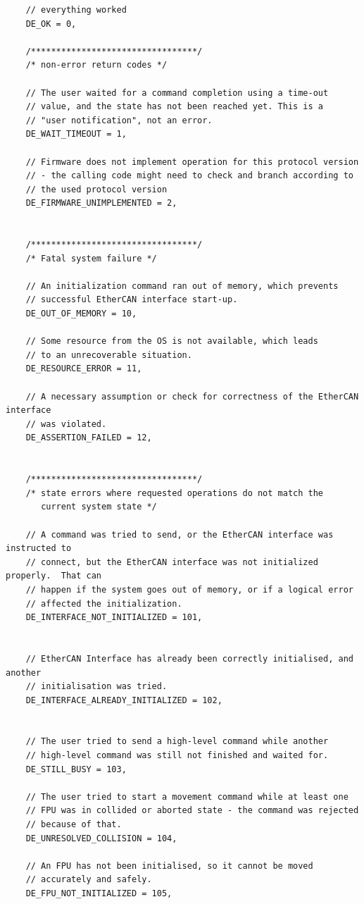 \documentclass[11pt,a4paper]{scrartcl}
\begin{document}
\begin{verbatim}
    // everything worked
    DE_OK = 0,

    /*********************************/
    /* non-error return codes */

    // The user waited for a command completion using a time-out
    // value, and the state has not been reached yet. This is a
    // "user notification", not an error.
    DE_WAIT_TIMEOUT = 1,

    // Firmware does not implement operation for this protocol version
    // - the calling code might need to check and branch according to
    // the used protocol version
    DE_FIRMWARE_UNIMPLEMENTED = 2,


    /*********************************/
    /* Fatal system failure */

    // An initialization command ran out of memory, which prevents
    // successful EtherCAN interface start-up.
    DE_OUT_OF_MEMORY = 10,

    // Some resource from the OS is not available, which leads
    // to an unrecoverable situation.
    DE_RESOURCE_ERROR = 11,

    // A necessary assumption or check for correctness of the EtherCAN interface
    // was violated.
    DE_ASSERTION_FAILED = 12,


    /*********************************/
    /* state errors where requested operations do not match the
       current system state */

    // A command was tried to send, or the EtherCAN interface was instructed to
    // connect, but the EtherCAN interface was not initialized properly.  That can
    // happen if the system goes out of memory, or if a logical error
    // affected the initialization.
    DE_INTERFACE_NOT_INITIALIZED = 101,


    // EtherCAN Interface has already been correctly initialised, and another
    // initialisation was tried.
    DE_INTERFACE_ALREADY_INITIALIZED = 102,


    // The user tried to send a high-level command while another
    // high-level command was still not finished and waited for.
    DE_STILL_BUSY = 103,

    // The user tried to start a movement command while at least one
    // FPU was in collided or aborted state - the command was rejected
    // because of that.
    DE_UNRESOLVED_COLLISION = 104,

    // An FPU has not been initialised, so it cannot be moved
    // accurately and safely.
    DE_FPU_NOT_INITIALIZED = 105,


\end{verbatim}
\end{document}
